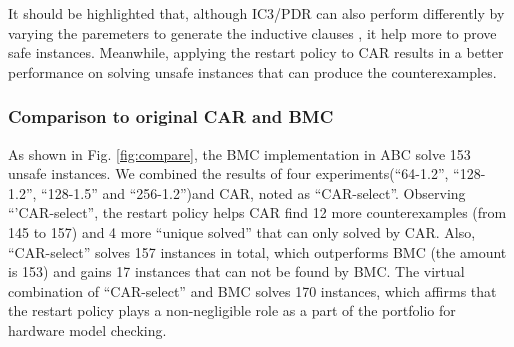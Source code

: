 It should be highlighted that, although IC3/PDR can also perform differently by varying the paremeters to generate the inductive clauses \cite{}, it help more to prove safe instances. Meanwhile, applying the restart policy to CAR results in a better performance on solving unsafe instances that can produce the counterexamples. 

\subsubsection{Comparison to original CAR and BMC }
As shown in Fig. \ref{fig:compare}, the BMC implementation in ABC solve 153 unsafe instances. We combined the results of four experiments(``64-1.2'', ``128-1.2'', ``128-1.5'' and ``256-1.2'')and CAR, noted as ``CAR-select''. Observing ``'CAR-select'', the restart policy helps CAR find 12 more counterexamples (from 145 to 157) and 4 more ``unique solved'' that can only solved by CAR. Also, ``CAR-select'' solves 157 instances in total, which outperforms BMC (the amount is 153) and gains 17 instances that can not be found by BMC. The virtual combination of ``CAR-select'' and BMC solves 170 instances, which affirms that the restart policy plays a non-negligible role as a part of the portfolio for hardware model checking.
